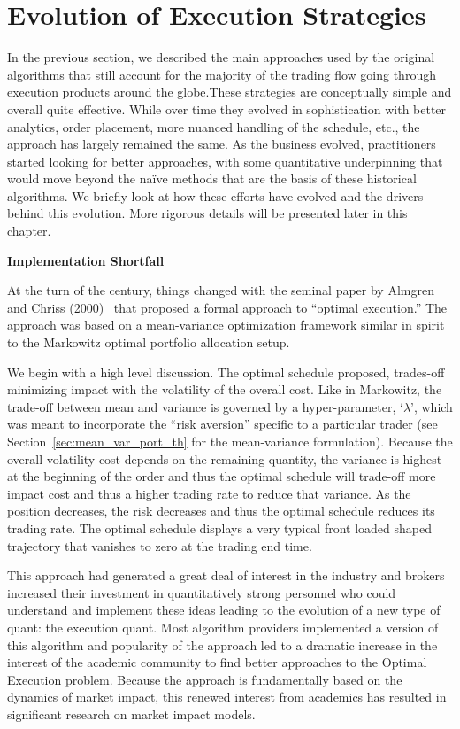 \section{Evolution of Execution Strategies\label{sec:evol_exec_strat}}

In the previous section, we described the main approaches used by the original algorithms that still account for the majority of the trading flow going through execution products around the globe.These strategies are conceptually simple and overall quite effective. While over time they evolved in sophistication with better analytics, order placement, more nuanced handling of the schedule, etc., the approach has largely remained the same. As the business evolved, practitioners started looking for better approaches, with some quantitative underpinning that would move beyond the na\"ive methods that are the basis of these historical algorithms. We briefly look at how these efforts have evolved and the drivers behind this evolution. More rigorous details will be presented later in this chapter. \twomedskip


\noindent\textbf{Implementation Shortfall} \twomedskip


At the turn of the century, things changed with the seminal paper by Almgren and Chriss (2000)~\cite{alm2000} that proposed a formal approach to ``optimal execution.'' The approach was based on a  mean-variance optimization framework similar in spirit to the Markowitz optimal portfolio allocation setup.


We begin with a high level discussion. The optimal schedule proposed, trades-off minimizing impact with the volatility of the overall cost. Like in Markowitz, the trade-off between mean and variance is governed by a hyper-parameter, `$\lambda$', which was meant to incorporate the ``risk aversion'' specific to a particular trader (see Section~\ref{sec:mean_var_port_th} for the mean-variance formulation). Because the overall volatility cost depends on the remaining quantity, the variance is highest at the beginning of the order and thus the optimal schedule will trade-off more impact cost and thus a higher trading rate to reduce that variance. As the position decreases, the risk decreases and thus the optimal schedule reduces its trading rate. The optimal schedule displays a very typical front loaded shaped trajectory that vanishes to zero at the trading end time.


This approach had generated a great deal of interest in the industry and brokers increased their investment in quantitatively strong personnel who could understand and implement these ideas leading to the evolution of a new type of quant: the execution quant. Most algorithm providers implemented a version of this algorithm and popularity of the approach led to a dramatic increase in the interest of the academic community to find better approaches to the Optimal Execution problem. Because the approach is fundamentally based on the dynamics of market impact, this renewed interest from academics has resulted in significant research on market impact models. 


